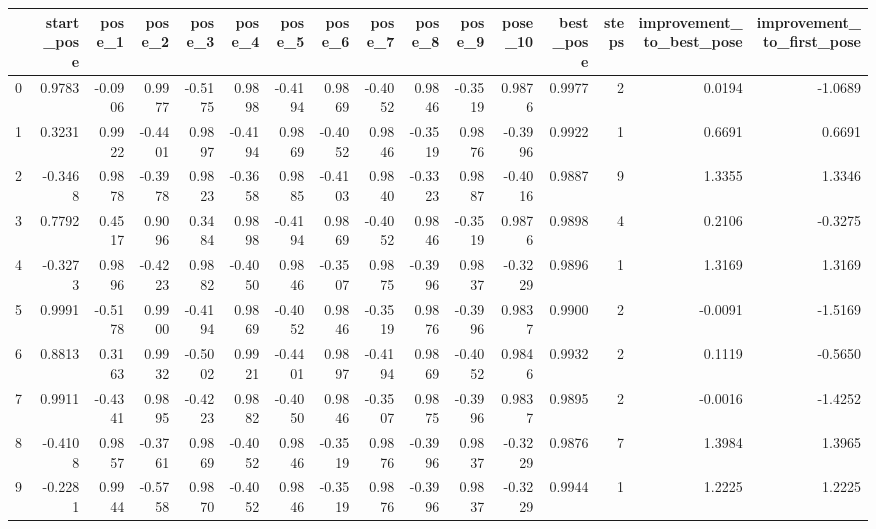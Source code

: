 \begin{tabular}{lrrrrrrrrrrrrrrr}
\toprule
{} &  start\_pose &  pose\_1 &  pose\_2 &  pose\_3 &  pose\_4 &  pose\_5 &  pose\_6 &  pose\_7 &  pose\_8 &  pose\_9 &  pose\_10 &  best\_pose &  steps &  improvement\_to\_best\_pose &  improvement\_to\_first\_pose \\
\midrule
0 &      0.9783 & -0.0906 &  0.9977 & -0.5175 &  0.9898 & -0.4194 &  0.9869 & -0.4052 &  0.9846 & -0.3519 &   0.9876 &     0.9977 &      2 &                    0.0194 &                    -1.0689 \\
1 &      0.3231 &  0.9922 & -0.4401 &  0.9897 & -0.4194 &  0.9869 & -0.4052 &  0.9846 & -0.3519 &  0.9876 &  -0.3996 &     0.9922 &      1 &                    0.6691 &                     0.6691 \\
2 &     -0.3468 &  0.9878 & -0.3978 &  0.9823 & -0.3658 &  0.9885 & -0.4103 &  0.9840 & -0.3323 &  0.9887 &  -0.4016 &     0.9887 &      9 &                    1.3355 &                     1.3346 \\
3 &      0.7792 &  0.4517 &  0.9096 &  0.3484 &  0.9898 & -0.4194 &  0.9869 & -0.4052 &  0.9846 & -0.3519 &   0.9876 &     0.9898 &      4 &                    0.2106 &                    -0.3275 \\
4 &     -0.3273 &  0.9896 & -0.4223 &  0.9882 & -0.4050 &  0.9846 & -0.3507 &  0.9875 & -0.3996 &  0.9837 &  -0.3229 &     0.9896 &      1 &                    1.3169 &                     1.3169 \\
5 &      0.9991 & -0.5178 &  0.9900 & -0.4194 &  0.9869 & -0.4052 &  0.9846 & -0.3519 &  0.9876 & -0.3996 &   0.9837 &     0.9900 &      2 &                   -0.0091 &                    -1.5169 \\
6 &      0.8813 &  0.3163 &  0.9932 & -0.5002 &  0.9921 & -0.4401 &  0.9897 & -0.4194 &  0.9869 & -0.4052 &   0.9846 &     0.9932 &      2 &                    0.1119 &                    -0.5650 \\
7 &      0.9911 & -0.4341 &  0.9895 & -0.4223 &  0.9882 & -0.4050 &  0.9846 & -0.3507 &  0.9875 & -0.3996 &   0.9837 &     0.9895 &      2 &                   -0.0016 &                    -1.4252 \\
8 &     -0.4108 &  0.9857 & -0.3761 &  0.9869 & -0.4052 &  0.9846 & -0.3519 &  0.9876 & -0.3996 &  0.9837 &  -0.3229 &     0.9876 &      7 &                    1.3984 &                     1.3965 \\
9 &     -0.2281 &  0.9944 & -0.5758 &  0.9870 & -0.4052 &  0.9846 & -0.3519 &  0.9876 & -0.3996 &  0.9837 &  -0.3229 &     0.9944 &      1 &                    1.2225 &                     1.2225 \\
\bottomrule
\end{tabular}
